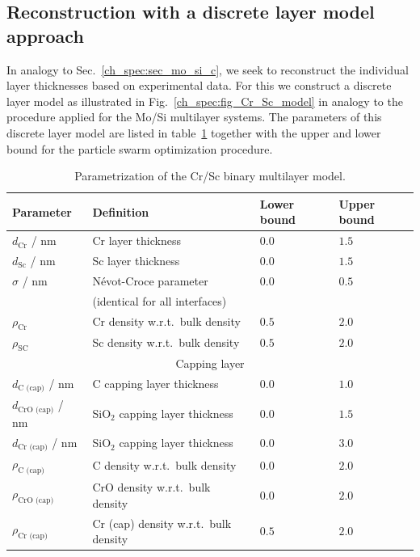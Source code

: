 \subsection{Reconstruction with a discrete layer model approach} \label{ch_spec:sec_CrSc_resconstrution_binary}
In analogy to Sec.~\ref{ch_spec:sec_mo_si_c}, we seek to reconstruct the individual layer thicknesses based on experimental data. For this we construct a discrete layer model as illustrated in Fig.~\ref{ch_spec:fig_Cr_Sc_model} in analogy to the procedure applied for the Mo/Si multilayer systems. The parameters of this discrete layer model are listed in table~\ref{ch_spec:tbl_cr_sc_binary_parameters} together with the upper and lower bound for the particle swarm optimization procedure.
\begin{table}[htbp]
\centering
\caption{Parametrization of the Cr/Sc binary multilayer model.}
\label{ch_spec:tbl_cr_sc_binary_parameters}
\begin{tabular}{@{}llll@{}}
\toprule
Parameter & Definition & Lower bound & Upper bound\\ \midrule
$d_\text{Cr}$ / nm & Cr layer thickness & $0.0$& $1.5$\\ 
$d_\text{Sc}$ / nm & Sc layer thickness& $0.0$& $1.5$\\ 
$\sigma$ / nm & N\'{e}vot-Croce parameter& $0.0$& $0.5$\\ 
&(identical for all interfaces)&&\\
$\rho_\text{Cr}$ &Cr density w.r.t.~bulk density & $0.5$& $2.0$\\ 
$\rho_\text{SC}$ &Sc density w.r.t.~bulk density& $0.5$& $2.0$\\ 
\midrule
\multicolumn{4}{c}{Capping layer}\\
\midrule
$d_\text{C (cap)}$ / nm & C capping layer thickness & $0.0$&$1.0$ \\ 
$d_\text{CrO (cap)}$ / nm & SiO$_2$ capping layer thickness & $0.0$&$1.5$ \\ 
$d_\text{Cr (cap)}$ / nm & SiO$_2$ capping layer thickness & $0.0$&$3.0$ \\ 
$\rho_\text{C (cap)}$ &C density w.r.t.~bulk density& $0.0$& $2.0$\\ 
$\rho_\text{CrO (cap)}$& CrO density w.r.t.~bulk density& $0.0$& $2.0$\\
$\rho_\text{Cr (cap)}$& Cr (cap) density w.r.t.~bulk density & $0.5$& $2.0$  \\
 \bottomrule
\end{tabular}
\end{table}

